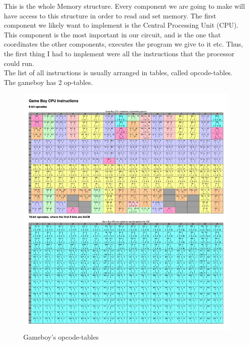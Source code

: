 \documentclass{article}
\begin{document}

This is the whole Memory structure. Every component we are going to make will have access to this structure in order to read and set memory.
\newpage
The first component we likely want to implement is the Central Processing Unit (CPU). This component is the most important in our circuit, and is the one that coordinates the other components, executes the program we give to it etc. Thus, the first thing I had to implement were all the instructions that the processor could run. \\
The list of all instructions is usually arranged in tables, called opcode-tables.\\
The gameboy has 2 op-tables.
\begin{figure}[H]
\includegraphics[width=1\textwidth]{./images/opcodes.png}
\centering
\caption{Gameboy's opcode-tables}
\label{fig:opcode-tables}

\end{figure}
\end{document}
